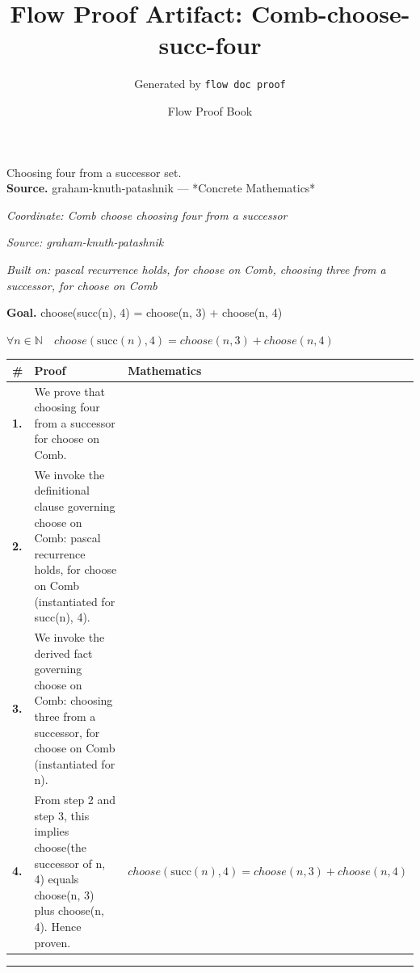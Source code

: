 \documentclass[11pt]{article}
\title{Flow Proof Artifact: Comb-choose-succ-four}
\author{Generated by \texttt{flow doc proof}}
\date{Flow Proof Book}
\theoremstyle{definition}
\begin{document}
\maketitle
Choosing four from a successor set.\\[0.5em]
\textbf{Source.} graham-knuth-patashnik — *Concrete Mathematics*\\[0.5em]
\bigskip
{}\par
\smallskip\noindent\textit{Coordinate: Comb \cdot choose \cdot choosing four from a successor}\par
\smallskip\noindent\textit{Source: graham-knuth-patashnik}\par
\smallskip\noindent\textit{Built on: pascal recurrence holds, for choose on Comb, choosing three from a successor, for choose on Comb}\par
\medskip
\noindent\textbf{Goal.} choose(succ(n), 4) = choose(n, 3) + choose(n, 4)\par
\noindent$\displaystyle \forall n \in \mathbb{N}\quad choose(\mathrm{succ}(n), 4) = choose(n, 3) + choose(n, 4)$\par
\medskip
\noindent
\begin{tabular}{@{} >{\raggedright\arraybackslash}p{} >{\raggedright\arraybackslash}p{} >{\raggedleft\arraybackslash}p{} @{}}
\textbf{\#} & \textbf{Proof} & \textbf{Mathematics} \\
\midrule
\textbf{1.} & We prove that choosing four from a successor for choose on Comb. & \\[0.45em]
\textbf{2.} & We invoke the definitional clause governing choose on Comb: pascal recurrence holds, for choose on Comb (instantiated for succ(n), 4). & \\[0.45em]
\textbf{3.} & We invoke the derived fact governing choose on Comb: choosing three from a successor, for choose on Comb (instantiated for n). & \\[0.45em]
\textbf{4.} & From step 2 and step 3, this implies choose(the successor of n, 4) equals choose(n, 3) plus choose(n, 4). Hence proven. & $\displaystyle choose(\mathrm{succ}(n), 4) = choose(n, 3) + choose(n, 4)$ \\[0.45em]
\bottomrule
\end{tabular}
\label{thm:Comb-choose-choosing_four_from_a_successor}
\par\medskip\hrule
\end{document}
